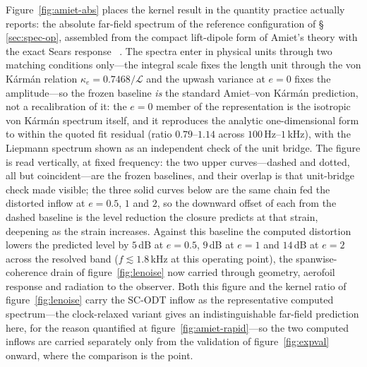 \documentclass[lineno]{JFM-FLM_Au}
\begin{document}
Figure~\ref{fig:amiet-abs} places the kernel result in the quantity
practice actually reports: the absolute far-field spectrum of the
reference configuration of \S\,\ref{sec:spec-op}, assembled from the
compact lift-dipole form of Amiet's theory with the exact Sears
response~ \citep{Sears1941}. The spectra enter in physical units through two matching
conditions only---the integral scale fixes the length unit through the
von K\'arm\'an relation $\kappa_e=0.7468/\mathcal{L}$ and the upwash
variance at $e=0$ fixes the amplitude---so the frozen baseline
\emph{is} the standard Amiet--von K\'arm\'an prediction, not a
recalibration of it: the $e=0$ member of the representation is the
isotropic von K\'arm\'an spectrum itself, and it reproduces the
analytic one-dimensional form to within the quoted fit residual
(ratio $0.79$--$1.14$ across $100$\,Hz--$1$\,kHz), with the Liepmann
spectrum shown as an independent check of the unit bridge. The figure
is read vertically, at fixed frequency: the two upper curves---dashed
and dotted, all but coincident---are the frozen baselines, and their
overlap is that unit-bridge check made visible; the three solid curves
below are the same chain fed the distorted inflow at $e=0.5$, $1$ and
$2$, so the downward offset of each from the dashed baseline is the
level reduction the closure predicts at that strain, deepening as the
strain increases. Against
this baseline the computed distortion lowers the predicted level by
$5$\,dB at $e=0.5$, $9$\,dB at $e=1$ and $14$\,dB at $e=2$ across the
resolved band ($f\lesssim1.8$\,kHz at this operating point), the
spanwise-coherence drain of figure~\ref{fig:lenoise} now carried
through geometry, aerofoil response and radiation to the observer.
Both this figure and the kernel ratio of figure~\ref{fig:lenoise}
carry the SC-ODT inflow as the representative computed spectrum---the
clock-relaxed variant gives an indistinguishable far-field prediction
here, for the reason quantified at figure~\ref{fig:amiet-rapid}---so
the two computed inflows are carried separately only from the
validation of figure~\ref{fig:expval} onward, where the comparison is
the point.
\end{document}
